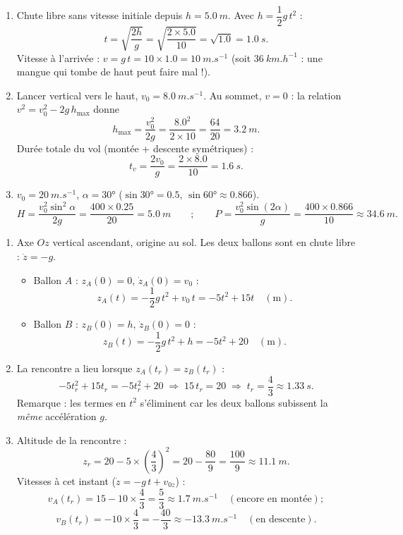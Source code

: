 \documentclass[11pt]{article}
\begin{document}
\begin{corrige}
\begin{enumerate}
\item Chute libre sans vitesse initiale depuis $h = \SI{5,0}{m}$. Avec $h = \dfrac{1}{2}g\,t^2$ :
\[ t = \sqrt{\frac{2h}{g}} = \sqrt{\frac{2\times \num{5,0}}{10}} = \sqrt{\num{1,0}} = \SI{1,0}{s}. \]
Vitesse à l'arrivée : $v = g\,t = 10\times \num{1,0} = \SI{10}{m.s^{-1}}$ (soit $\SI{36}{km.h^{-1}}$ : une mangue qui tombe de haut peut faire mal !).
\item Lancer vertical vers le haut, $v_0 = \SI{8,0}{m.s^{-1}}$. Au sommet, $v = 0$ : la relation $v^2 = v_0^2 - 2g\,h_{\max}$ donne
\[ h_{\max} = \frac{v_0^2}{2g} = \frac{\num{8,0}^2}{2\times 10} = \frac{64}{20} = \SI{3,2}{m}. \]
Durée totale du vol (montée + descente symétriques) :
\[ t_v = \frac{2v_0}{g} = \frac{2\times \num{8,0}}{10} = \SI{1,6}{s}. \]
\item $v_0 = \SI{20}{m.s^{-1}}$, $\alpha = 30°$ ($\sin 30° = \num{0,5}$, $\sin 60° \approx \num{0,866}$).
\[ H = \frac{v_0^2\sin^2\alpha}{2g} = \frac{400\times \num{0,25}}{20} = \SI{5,0}{m} \qquad ; \qquad P = \frac{v_0^2\sin(2\alpha)}{g} = \frac{400\times \num{0,866}}{10} \approx \SI{34,6}{m}. \]
\end{enumerate}
\end{corrige}

\begin{corrige}
\begin{enumerate}
\item Axe $Oz$ vertical ascendant, origine au sol. Les deux ballons sont en chute libre : $\ddot{z} = -g$.
\begin{itemize}
\item Ballon $A$ : $z_A(0) = 0$, $\dot{z}_A(0) = v_0$ :
\[ z_A(t) = -\frac{1}{2}g\,t^2 + v_0\,t = -5t^2 + 15t \quad (\mathrm{m}). \]
\item Ballon $B$ : $z_B(0) = h$, $\dot{z}_B(0) = 0$ :
\[ z_B(t) = -\frac{1}{2}g\,t^2 + h = -5t^2 + 20 \quad (\mathrm{m}). \]
\end{itemize}
\item La rencontre a lieu lorsque $z_A(t_r) = z_B(t_r)$ :
\[ -5t_r^2 + 15t_r = -5t_r^2 + 20 \;\Longrightarrow\; 15\,t_r = 20 \;\Longrightarrow\; t_r = \frac{4}{3} \approx \SI{1,33}{s}. \]
Remarque : les termes en $t^2$ s'éliminent car les deux ballons subissent la \emph{même} accélération $g$.
\item Altitude de la rencontre :
\[ z_r = 20 - 5\times\left(\frac{4}{3}\right)^2 = 20 - \frac{80}{9} = \frac{100}{9} \approx \SI{11,1}{m}. \]
Vitesses à cet instant ($\dot{z} = -g\,t + v_{0z}$) :
\[ v_A(t_r) = 15 - 10\times\frac{4}{3} = \frac{5}{3} \approx \SI{1,7}{m.s^{-1}} \quad (\text{encore en montée}) ; \]
\[ v_B(t_r) = -10\times\frac{4}{3} = -\frac{40}{3} \approx \SI{-13,3}{m.s^{-1}} \quad (\text{en descente}). \]
\end{enumerate}
\end{corrige}
\end{document}
